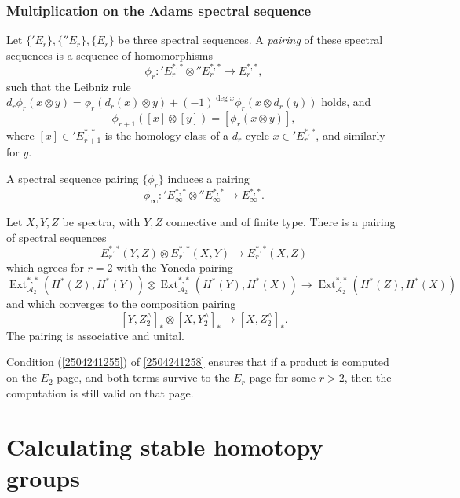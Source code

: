 \documentclass{MetricNotes2023}
\def\A{\ensuremath{\mathscr{A}_2}}
\DeclareMathOperator{\Ext}{Ext}
\begin{document}
\subsubsection{Multiplication on the Adams spectral sequence}

\begin{definition}\label{2504241258}
Let \(\{'E_r\}, \{''E_r\}, \{E_r\}\) be three spectral sequences. A \textit{pairing} of these spectral sequences is a sequence of homomorphisms 
\[\phi_r : \text{}'E_r^{*,*}\otimes \text{}''E_r^{*,*} \to E_r^{*,*},\]
such that the Leibniz rule \(d_r\phi_r(x\otimes y)=\phi_r(d_r(x)\otimes y)+(-1)^{\deg x}\phi_r(x\otimes d_r(y))\) holds, and
\begin{equation}\label{2504241255}
\phi_{r+1}([x]\otimes[y])=[\phi_r(x\otimes y)],
\end{equation}
where \([x]\in \text{}'E_{r+1}^{*,*}\) is the homology class of a \(d_r\)-cycle \(x\in \text{}'E_r^{*,*}\), and similarly for \(y\).
\end{definition}

A spectral sequence pairing \(\{\phi_r\}\) induces a pairing 
\[\phi_\infty : \text{}'E_\infty^{*,*}\otimes \text{}''E^{*,*}_\infty \to E^{*,*}_\infty.\]

\begin{theorem}
Let \(X,Y,Z\) be spectra, with \(Y, Z\) connective and of finite type. There is a pairing of spectral sequences
\[E^{*,*}_r(Y,Z)\otimes E^{*,*}_r(X,Y)\to E^{*,*}_r(X,Z)\]
which agrees for \(r=2\) with the Yoneda pairing
\[\Ext^{*,*}_{\A}(H^*(Z), H^*(Y))\otimes \Ext_{\A}^{*,*}(H^*(Y), H^*(X))\to \Ext_{\A}^{*,*}(H^*(Z), H^*(X))\]
and which converges to the composition pairing
\[[Y, Z^\wedge_2]_*\otimes [X,Y^\wedge_2]_* \to [X, Z^\wedge_2]_*.\]
The pairing is associative and unital.
\end{theorem}

\begin{remark}
Condition (\ref{2504241255}) of \ref{2504241258} ensures that if a product is computed on the \(E_2\) page, and both terms survive to the \(E_r\) page for some \(r>2\), then the computation is still valid on that page.
\end{remark}

\section{Calculating stable homotopy groups}
\end{document}
